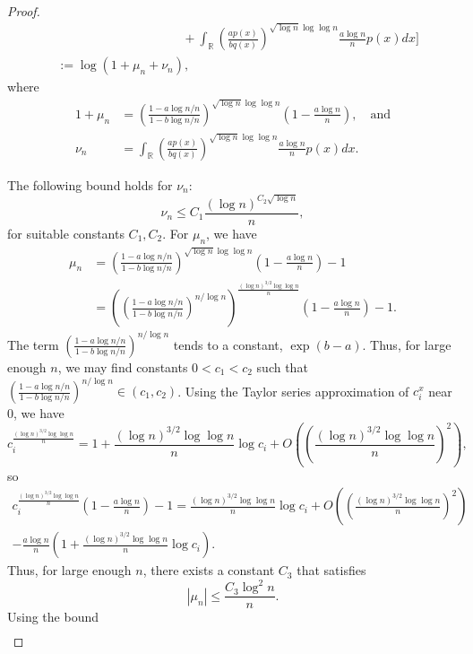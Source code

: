 \begin{proof}
\begin{align*}
%
&\qquad \qquad \qquad \qquad \qquad + \int_{\mathbb R} \left(\frac{ap(x)}{bq(x)}\right)^{\sqrt{\log n}\log\log n} \frac{a\log n}{n}p(x)dx\Bigg]\\
%
&:= \log(1 + \mu_n + \nu_n),
\end{align*}
where
\begin{align*}
1 + \mu_n &= \left( \frac{1-a\log n/n}{1 - b\log n/n}\right)^{\sqrt{\log n}\log \log n} \left(1-\frac{a\log n}{n}\right), \quad \text{and} \\
\nu_n &= \int_{\mathbb R} \left(\frac{ap(x)}{bq(x)}\right)^{\sqrt{\log n}\log\log n} \frac{a\log n}{n}p(x)dx.
\end{align*}

The following bound holds for $\nu_n$:
\begin{equation*}
\nu_n  \leq C_1 \frac{(\log n)^{C_2\sqrt{\log n}}}{n},
\end{equation*}
for suitable constants $C_1, C_2$. For $\mu_n$, we have
\begin{align*}
\mu_n &= \left( \frac{1-a\log n/n}{1 - b\log n/n}\right)^{\sqrt{\log n}\log \log n} \left(1-\frac{a\log n}{n}\right) - 1\\
%
&= \left(\left( \frac{1-a\log n/n}{1 - b\log n/n}\right)^{n/\log n}\right)^{\frac{(\log n)^{3/2}\log \log n}{n} } \left(1-\frac{a\log n}{n}\right) - 1.
\end{align*}
The term $\left( \frac{1-a\log n/n}{1 - b\log n/n}\right)^{n/\log n}$ tends to a constant, $\exp(b-a)$. Thus, for large enough $n$, we may find constants $0 <c_1 < c_2$ such that $\left( \frac{1-a\log n/n}{1 - b\log n/n}\right)^{n/\log n} \in (c_1, c_2)$. Using the Taylor series approximation of $c_i^x$ near 0, we have
$$c_i^{\frac{(\log n)^{3/2}\log \log n}{n}} = 1 + \frac{(\log n)^{3/2}\log \log n}{n}\log c_i + O\left(\left(\frac{(\log n)^{3/2}\log \log n}{n}\right)^2\right),$$
so
\begin{multline*}
c_i^{\frac{(\log n)^{3/2}\log \log n}{n}}\left(1-\frac{a\log n}{n}\right) - 1= \frac{(\log n)^{3/2} \log\log n}{n}\log c_i + O\left(\left(\frac{(\log n)^{3/2}\log \log n}{n}\right)^2\right) \\
%
- \frac{a\log n}{n} \left(1 + \frac{(\log n)^{3/2} \log \log n}{n} \log c_i\right).
\end{multline*}
Thus, for large enough $n$, there exists a constant $C_3$ that satisfies
\begin{equation*}
|\mu_n| \leq \frac{C_3\log^2 n}{n}.
\end{equation*}
Using the bound
\begin{align*}

\end{align*}
\end{proof}
